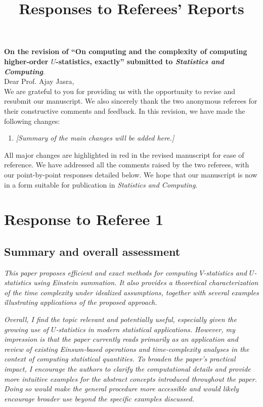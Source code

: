\documentclass[12pt]{article}
\theoremstyle{plain}
\theoremstyle{definition}
\begin{document}
\title{Responses to Referees' Reports}
\date{}
\author{}
\maketitle

\vspace{-4em}


\textbf{On the revision of ``On computing and the complexity of
computing higher-order $U$-statistics, exactly'' submitted to \emph{Statistics and Computing}}. \\

Dear Prof. Ajay Jasra, \\

We are grateful to you for providing us with the opportunity to revise and resubmit our manuscript. We also sincerely thank the two anonymous referees for their constructive comments and feedback. In this revision, we have made the following changes:
\begin{enumerate}
\item \emph{[Summary of the main changes will be added here.]}
\end{enumerate}
All major changes are highlighted in {\color{red}red} in the revised manuscript for ease of reference. We have addressed all the comments raised by the two referees, with our point-by-point responses detailed below. We hope that our manuscript is now in a form suitable for publication in \emph{Statistics and Computing}.

\newpage

\section*{Response to Referee 1}

\subsection*{Summary and overall assessment}

\emph{This paper proposes efficient and exact methods for computing $V$-statistics and $U$-statistics using Einstein summation. It also provides a theoretical characterization of the time complexity under idealized assumptions, together with several examples illustrating applications of the proposed approach.}

\emph{Overall, I find the topic relevant and potentially useful, especially given the growing use of $U$-statistics in modern statistical applications. However, my impression is that the paper currently reads primarily as an application and review of existing Einsum-based operations and time-complexity analyses in the context of computing statistical quantities. To broaden the paper's practical impact, I encourage the authors to clarify the computational details and provide more intuitive examples for the abstract concepts introduced throughout the paper. Doing so would make the general procedure more accessible and would likely encourage broader use beyond the specific examples discussed.}
\end{document}
